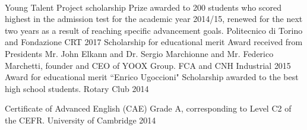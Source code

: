 \\
\begin{cvhonors}
  \cvhonor
    {Young Talent Project scholarship}
    {\newline Prize awarded to 200 students who scored highest in the admission test for the academic year 2014/15, renewed for the next two years as a result of reaching specific advancement goals.}
    {Politecnico di Torino and Fondazione CRT}
    {2017}
  \cvhonor
    {Scholarship for educational merit}
    {\newline Award received from Presidents Mr. John Elkann and Dr. Sergio Marchionne and Mr. Federico Marchetti, founder and CEO of YOOX Group.}
    {FCA and CNH Industrial}
    {2015}
  \cvhonor
    {Award for educational merit ``Enrico Ugoccioni"}
    {\newline Scholarship awarded to the best high school students.}
    {Rotary Club}
    {2014}
\end{cvhonors}

\begin{cvhonors}
  \cvhonor
    {Certificate of Advanced English (CAE)}
    {\newline Grade A, corresponding to Level C2 of the CEFR.}
    {University of Cambridge}
    {2014}
\end{cvhonors}
